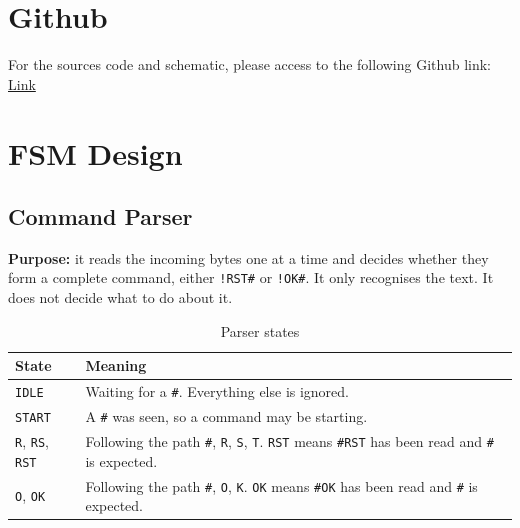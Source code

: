 \section{Github}
\label{sec:Github}
For the sources code and schematic, please access to the following Github link: \href{https://github.com/Lmonk555/lab05_micro_process_control}{Link}










\section{FSM Design}
\subsection{Command Parser}

\textbf{Purpose:} it reads the incoming bytes one at a time and decides whether they form a complete command, either \texttt{!RST\#} or \texttt{!OK\#}. It only recognises the text. It does not decide what to do about it. \\

\begin{table}[H]
    \centering
    \begin{tabularx}{\linewidth}{|l|X|}
        \hline
        \textbf{State} & \textbf{Meaning} \\
        \hline

        \texttt{IDLE} &
        Waiting for a \texttt{\#}. Everything else is ignored. \\
        \hline

        \texttt{START} &
        A \texttt{\#} was seen, so a command may be starting. \\
        \hline

        \texttt{R}, \texttt{RS}, \texttt{RST} &
        Following the path \texttt{\#}, \texttt{R}, \texttt{S}, \texttt{T}. \texttt{RST} means \texttt{\#RST} has been read and \texttt{\#} is expected. \\
        \hline
        
        \texttt{O}, \texttt{OK} &
        Following the path \texttt{\#}, \texttt{O}, \texttt{K}. \texttt{OK} means \texttt{\#OK} has been read and \texttt{\#} is expected. \\
        \hline
    \end{tabularx}
    \caption{Parser states}
\end{table}

